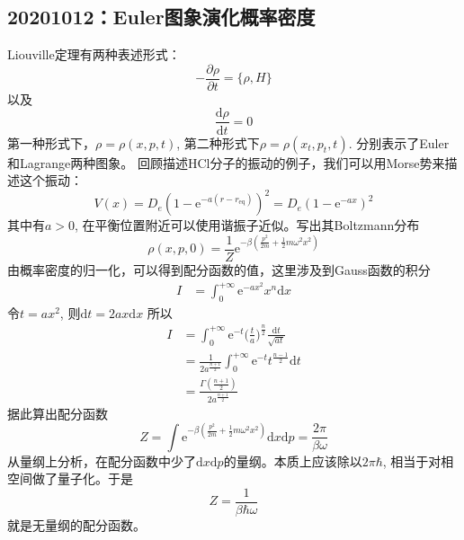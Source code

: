     \subsection{20201012：Euler图象演化概率密度}
    Liouville定理有两种表述形式：
    \begin{equation*}
        -\frac {\partial \rho}{\partial t} = \{ \rho,H \}
    \end{equation*}
    以及 
    \begin{equation*}
        \frac {\mathrm{d}\rho}{\mathrm{d}t} = 0
    \end{equation*}
    第一种形式下，$\rho = \rho(x, p ,t)$, 第二种形式下$\rho = \rho(x_t,p_t,t)$. 分别表示了Euler和Lagrange两种图象。
    回顾描述HCl分子的振动的例子，我们可以用Morse势来描述这个振动：
    \begin{equation*}
        V(x) = D_e (1- \mathrm{e}^{-a(r-r_\mathrm{eq})})^2 = D_e(1-\mathrm{e}^{-ax})^2
    \end{equation*}
    其中有$a>0$, 在平衡位置附近可以使用谐振子近似。写出其Boltzmann分布
    \begin{equation*}
        \rho(x,p,0) = \frac 1Z \mathrm{e}^{-\beta (\frac {p^2}{2m} + \frac 12 m\omega^2 x^2)} 
    \end{equation*}
    由概率密度的归一化，可以得到配分函数的值，这里涉及到Gauss函数的积分
    \begin{align*}
        I &= \int_0^{+\infty} \mathrm{e}^{-ax^2} x^{n} \mathrm{d}x
    \end{align*}
    令$t = ax^2$, 则$\mathrm{d}t = 2ax\mathrm{d}x$
    所以
    \begin{align*}
    I &= \int_0^{+\infty} \mathrm{e}^{-t} \bigg(\frac ta\bigg)^{\frac n2} \frac {\mathrm{d}t}{\sqrt{at}}\\
    &= \frac 1{2a^{\frac {n+1}2}} \int_0^{+\infty} \mathrm{e}^{-t} t^{\frac {n-1}2} \mathrm{d}t\\
    &= \frac {\Gamma(\frac {n+1}2)}{2a^{\frac {n+1}2}}
    \end{align*}
    据此算出配分函数
    \begin{equation*}
        Z = \int \mathrm{e}^{-\beta (\frac {p^2}{2m} + \frac 12 m\omega^2 x^2)} \mathrm{d}x\mathrm{d}p = \frac {2\pi}{\beta \omega}
    \end{equation*}
    从量纲上分析，在配分函数中少了$\mathrm{d}x\mathrm{d}p$的量纲。本质上应该除以$2\pi\hbar$, 相当于对相空间做了量子化。于是
    \begin{equation*}
        Z = \frac 1{\beta \hbar \omega}
    \end{equation*}
    就是无量纲的配分函数。

